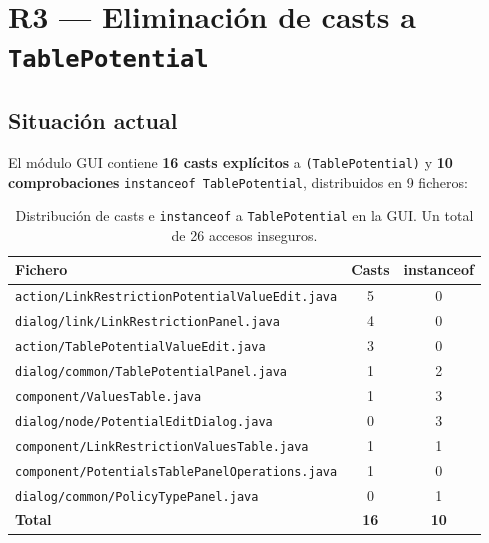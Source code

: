 \documentclass[12pt,a4paper]{article}
\newcommand{\code}[1]{\texttt{#1}}
\newcommand{\clase}[1]{\texttt{#1}}
\begin{document}
\section{R3 --- Eliminación de casts a \clase{TablePotential}}
\label{sec:r3}

\subsection{Situación actual}

El módulo GUI contiene \textbf{16 casts explícitos} a
\code{(TablePotential)} y \textbf{10 comprobaciones}
\code{instanceof TablePotential}, distribuidos en 9 ficheros:

\begin{table}[H]
\centering
\small
\begin{tabular}{lcc}
\toprule
\textbf{Fichero} & \textbf{Casts} & \textbf{instanceof} \\
\midrule
\code{action/LinkRestrictionPotentialValueEdit.java}      & 5 & 0 \\
\code{dialog/link/LinkRestrictionPanel.java}              & 4 & 0 \\
\code{action/TablePotentialValueEdit.java}                & 3 & 0 \\
\code{dialog/common/TablePotentialPanel.java}             & 1 & 2 \\
\code{component/ValuesTable.java}                         & 1 & 3 \\
\code{dialog/node/PotentialEditDialog.java}               & 0 & 3 \\
\code{component/LinkRestrictionValuesTable.java}          & 1 & 1 \\
\code{component/PotentialsTablePanelOperations.java}      & 1 & 0 \\
\code{dialog/common/PolicyTypePanel.java}                 & 0 & 1 \\
\midrule
\textbf{Total}                                            & \textbf{16} & \textbf{10} \\
\bottomrule
\end{tabular}
\caption{Distribución de casts e \code{instanceof} a \clase{TablePotential}
         en la GUI. Un total de 26 accesos inseguros.}
\label{tab:r3-casts}
\end{table}
\end{document}
